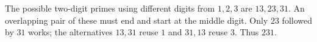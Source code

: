 The possible two-digit primes using different digits from $1,2,3$ are $13,23,31$. An overlapping pair of these must end and start at the middle digit. Only $23$ followed by $31$ works; the alternatives $13,31$ reuse $1$ and $31,13$ reuse $3$. Thus $\boxed{231}$.
